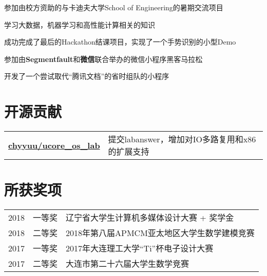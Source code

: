 \documentclass[]{deedy-resume-openfont}
\begin{document}
\begin{minipage}[t]{0.73\textwidth}
\begin{tightemize}
    \item 参加由校方资助的与卡迪夫大学School of Engineering的暑期交流项目
    \item 学习大数据，机器学习和高性能计算相关的知识
    \item 成功完成了最后的Hackathon结课项目，实现了一个手势识别的小型Demo
    \end{tightemize}
\sectionsep

\begin{tightemize}
    \item 参加由\textbf{Segmentfault}和\textbf{微信}联合举办的微信小程序黑客马拉松
    \item 开发了一个尝试取代“腾讯文档”的省时组队的小程序
    \end{tightemize}
\sectionsep





\section{开源贡献}
\begin{tabular}{ll}
\href{https://github.com/chyyuu/ucore_os_lab}{\bf chyyuu/ucore\_os\_lab} & 提交labanswer，增加对IO多路复用和x86的扩展支持 \\
\end{tabular}
\sectionsep


\section{所获奖项} 
\begin{tabular}{rll}
2018	     & 一等奖  & 辽宁省大学生计算机多媒体设计大赛 + 奖学金 \\
2018         & 二等奖  & 2018年第八届APMCM亚太地区大学生数学建模竞赛 \\
2017	     & 一等奖  & 2017年大连理工大学“Ti”杯电子设计大赛 \\
2017	     & 二等奖  & 大连市第二十六届大学生数学竞赛 \\
\end{tabular}
\sectionsep


% 
% 

\end{minipage} 
\end{document}
